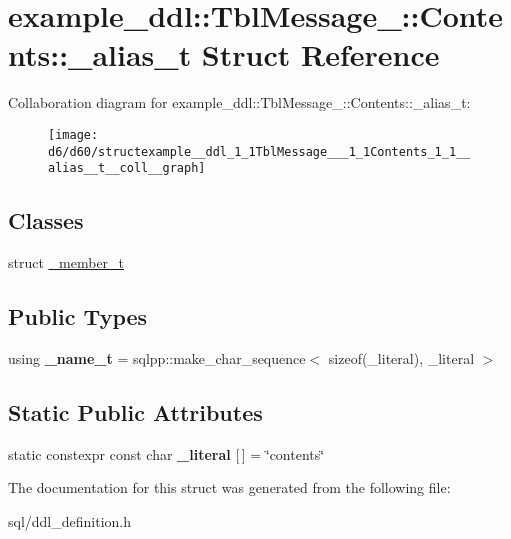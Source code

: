 \hypertarget{structexample__ddl_1_1TblMessage___1_1Contents_1_1__alias__t}{}\section{example\+\_\+ddl\+:\+:Tbl\+Message\+\_\+\+:\+:Contents\+:\+:\+\_\+alias\+\_\+t Struct Reference}
\label{structexample__ddl_1_1TblMessage___1_1Contents_1_1__alias__t}


Collaboration diagram for example\+\_\+ddl\+:\+:Tbl\+Message\+\_\+\+:\+:Contents\+:\+:\+\_\+alias\+\_\+t\+:
\nopagebreak
\begin{figure}[H]
\begin{center}
\leavevmode
\texttt{[image: d6/d60/structexample\_\_ddl\_1\_1TblMessage\_\_\_1\_1Contents\_1\_1\_\_alias\_\_t\_\_coll\_\_graph]}
\end{center}
\end{figure}
\subsection*{Classes}
\begin{DoxyCompactItemize}
\item 
struct \hyperlink{structexample__ddl_1_1TblMessage___1_1Contents_1_1__alias__t_1_1__member__t}{\+\_\+member\+\_\+t}
\end{DoxyCompactItemize}
\subsection*{Public Types}
\begin{DoxyCompactItemize}
\item 
\hypertarget{structexample__ddl_1_1TblMessage___1_1Contents_1_1__alias__t_aef0f355d2c9cbd7d4292a9e9d5304933}{}using {\bfseries \+\_\+name\+\_\+t} = sqlpp\+::make\+\_\+char\+\_\+sequence$<$ sizeof(\+\_\+literal), \+\_\+literal $>$\label{structexample__ddl_1_1TblMessage___1_1Contents_1_1__alias__t_aef0f355d2c9cbd7d4292a9e9d5304933}

\end{DoxyCompactItemize}
\subsection*{Static Public Attributes}
\begin{DoxyCompactItemize}
\item 
\hypertarget{structexample__ddl_1_1TblMessage___1_1Contents_1_1__alias__t_a615a79267f6957b7167379ac7c52d824}{}static constexpr const char {\bfseries \+\_\+literal} \mbox{[}$\,$\mbox{]} = \char`\"{}contents\char`\"{}\label{structexample__ddl_1_1TblMessage___1_1Contents_1_1__alias__t_a615a79267f6957b7167379ac7c52d824}

\end{DoxyCompactItemize}


The documentation for this struct was generated from the following file\+:\begin{DoxyCompactItemize}
\item 
sql/ddl\+\_\+definition.\+h\end{DoxyCompactItemize}
